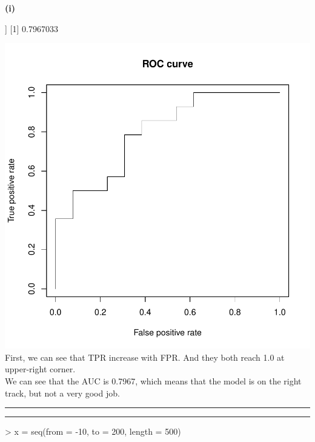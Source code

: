 \documentclass[a4paper]{article}
\newcommand{\question}[2] {\vspace{.25in} \hrule\vspace{0.5em}
\noindent{\bf #1: #2} \vspace{0.5em}
\hrule \vspace{.10in}}
\renewcommand{\part}[1] {\vspace{.10in} {\bf (#1)}}
\begin{document}
\part{i}
\begin{Schunk}
\begin{Soutput}
[[1]]
[1] 0.7967033
\end{Soutput}
\end{Schunk}
\includegraphics{category_response-1i}
{\color{red}\\
First, we can see that TPR increase with FPR. And they both reach 1.0 at upper-right corner.\\
We can see that the AUC is 0.7967, which means that the model is on the right track, but not a very good job.
}


\question{2}{Experiment}
\begin{Schunk}
\begin{Sinput}
> x = seq(from = -10, to = 200, length = 500)
\end{Sinput}
\end{Schunk}
\end{document}
